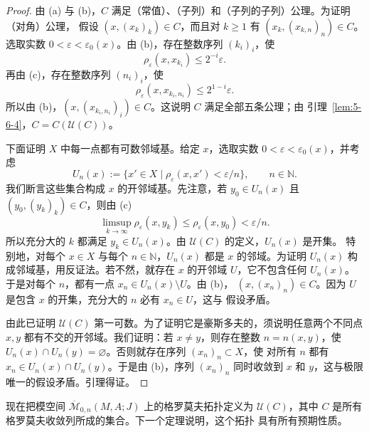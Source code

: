 \begin{proof}
由 (a) 与 (b)，$C$ 满足（常值）、（子列）和（子列的子列）公理。为证明（对角）公理，
假设 $(x,(x_k)_k)\in C$，而且对 $k\ge1$ 有 $(x_k,(x_{k,n})_n)\in C$。选取实数
$0<\varepsilon<\varepsilon_0(x)$。由 (b)，存在整数序列 $(k_i)_i$，使
\[
  \rho_\varepsilon(x,x_{k_i})\le2^{-i}\varepsilon.
\]
再由 (c)，存在整数序列 $(n_i)_i$，使
\[
  \rho_\varepsilon(x,x_{k_i,n_i})\le2^{1-i}\varepsilon.
\]
所以由 (b)，$(x,(x_{k_i,n_i})_i)\in C$。这说明 $C$ 满足全部五条公理；由
引理~\ref{lem:5-6-4}，$C=C(\mathcal U(C))$。

下面证明 $X$ 中每一点都有可数邻域基。给定 $x$，选取实数
$0<\varepsilon<\varepsilon_0(x)$，并考虑
\[
  U_n(x):=\{x'\in X\mid\rho_\varepsilon(x,x')<\varepsilon/n\},
  \qquad n\in\mathbb N.
\]
我们断言这些集合构成 $x$ 的开邻域基。先注意，若 $y_0\in U_n(x)$ 且
$(y_0,(y_k)_k)\in C$，则由 (c)
\[
  \limsup_{k\to\infty}\rho_\varepsilon(x,y_k)
  \le\rho_\varepsilon(x,y_0)<\varepsilon/n.
\]
所以充分大的 $k$ 都满足 $y_k\in U_n(x)$。由 $\mathcal U(C)$ 的定义，$U_n(x)$ 是开集。
特别地，对每个 $x\in X$ 与每个 $n\in\mathbb N$，$U_n(x)$ 都是 $x$ 的邻域。为证明
$U_n(x)$ 构成邻域基，用反证法。若不然，就存在 $x$ 的开邻域 $U$，它不包含任何
$U_n(x)$。于是对每个 $n$，都有一点 $x_n\in U_n(x)\setminus U$。由 (b)，
$(x,(x_n)_n)\in C$。因为 $U$ 是包含 $x$ 的开集，充分大的 $n$ 必有 $x_n\in U$，这与
假设矛盾。

由此已证明 $\mathcal U(C)$ 第一可数。为了证明它是豪斯多夫的，须说明任意两个不同点
$x,y$ 都有不交的开邻域。我们证明：若 $x\ne y$，则存在整数
$n=n(x,y)$，使 $U_n(x)\cap U_n(y)=\varnothing$。否则就存在序列 $(x_n)_n\subset X$，使
对所有 $n$ 都有 $x_n\in U_n(x)\cap U_n(y)$。于是由 (b)，序列 $(x_n)_n$ 同时收敛到
$x$ 和 $y$，这与极限唯一的假设矛盾。引理得证。
\end{proof}

现在把模空间 $\overline{\mathcal M}_{0,n}(M,A;J)$ 上的格罗莫夫拓扑定义为
$\mathcal U(C)$，其中 $C$ 是所有格罗莫夫收敛列所成的集合。下一个定理说明，这个拓扑
具有所有预期性质。


